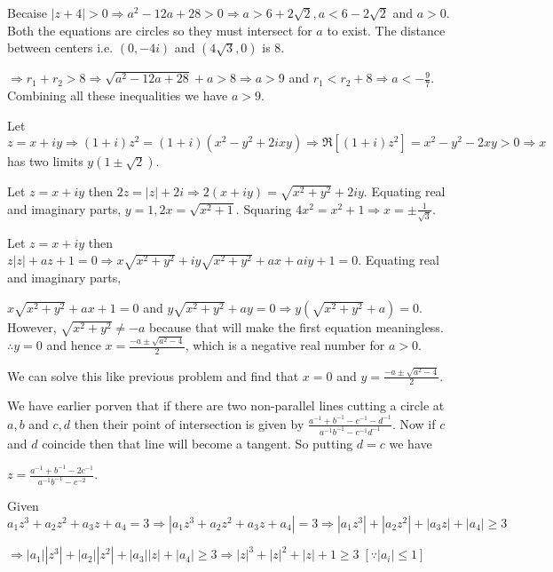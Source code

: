   Becaise $|z + 4| > 0 \Rightarrow a^2 - 12a + 28 > 0 \Rightarrow a > 6 + 2\sqrt{2}, a < 6 - 2\sqrt{2}$ and
  $a > 0$. Both the equations are  circles so they must intersect for $a$ to exist. The distance between
  centers i.e. $(0, -4i)$ and $(4\sqrt{3}, 0)$ is $8$.

  $\Rightarrow r_1 + r_2 > 8 \Rightarrow \sqrt{a^2 - 12a + 28} + a > 8 \Rightarrow a > 9$ and $r_1 < r_2 + 8
  \Rightarrow a < -\frac{9}{7}$. Combining all these inequalities we have $a > 9$.
\item Let $z = x + iy \Rightarrow (1 + i)z^2 = (1 + i)(x^2 - y^2 + 2ixy)\Rightarrow \Re[(1 + i)z^2] = x^2 -
  y^2 - 2xy > 0 \Rightarrow x$ has two limits $y(1 \pm\sqrt{2})$.
\item Let $z = x + iy$ then $2z = |z| + 2i \Rightarrow 2(x + iy) = \sqrt{x^2 + y^2} + 2iy$. Equating real
  and imaginary parts, $y = 1, 2x = \sqrt{x^2 + 1}$. Squaring $4x^2 = x^2 + 1 \Rightarrow x =
  \pm\frac{1}{\sqrt{3}}$.
\item Let $z = x + iy$ then $z|z| + az + 1 = 0 \Rightarrow x\sqrt{x^2 + y^2} + iy\sqrt{x^2 + y^2} + ax +
  aiy + 1 = 0$. Equating real and imaginary parts,

  $x\sqrt{x^2 + y^2} + ax + 1 = 0$ and $y\sqrt{x^2 + y^2} + ay = 0 \Rightarrow y(\sqrt{x^2 + y^2} + a) =
  0$. However, $\sqrt{x^2 + y^2}\neq -a$ because that will make the first equation meaningless. $\therefore
  y = 0$ and hence $x = \frac{-a \pm\sqrt{a^2 - 4}}{2}$, which is a negative real number for $a > 0$.
\item We can solve this like previous problem and find that $x = 0$ and $y = \frac{-a \pm\sqrt{a^2 -
    4}}{2}$.
\item We have earlier porven that if there are two non-parallel lines cutting a circle at $a, b$ and $c, d$
  then their point of intersection is given by $\frac{a^{-1} + b^{-1} - c^{-1} - d^{-1}}{a^{-1}b^{-1}-
    c^{-1}d^{-1}}$. Now if $c$ and $d$ coincide then that line will become a tangent. So putting $d = c$ we
  have

  $z = \frac{a^{-1} + b^{-1} - 2c^{-1}}{a^{-1}b^{-1} - c^{-2}}$.
\item Given $a_1z^3 + a_2z^2 + a_3z + a_4 = 3 \Rightarrow |a_1z^3 + a_2z^2 + a_3z + a_4| = 3 \Rightarrow
  |a_1z^3| + |a_2z^2| + |a_3z| + |a_4| \geq 3$

  $\Rightarrow |a_1||z^3| + |a_2||z^2| + |a_3||z| + |a_4|\geq 3 \Rightarrow |z|^3 + |z|^2 + |z| + 1\geq
  3\;[\because |a_i|\leq 1]$


